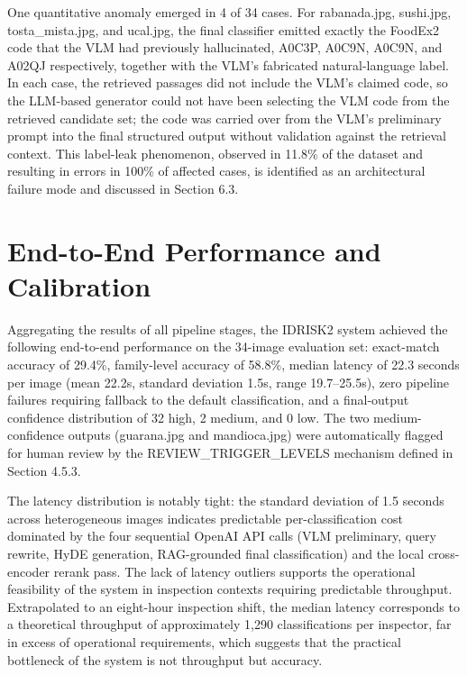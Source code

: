 One quantitative anomaly emerged in 4 of 34 cases. For rabanada.jpg, sushi.jpg, tosta\_mista.jpg, and ucal.jpg, the final classifier emitted exactly the FoodEx2 code that the VLM had previously hallucinated, A0C3P, A0C9N, A0C9N, and A02QJ respectively, together with the VLM's fabricated natural-language label. In each case, the retrieved passages did not include the VLM's claimed code, so the LLM-based generator could not have been selecting the VLM code from the retrieved candidate set; the code was carried over from the VLM's preliminary prompt into the final structured output without validation against the retrieval context. This label-leak phenomenon, observed in 11.8\% of the dataset and resulting in errors in 100\% of affected cases, is identified as an architectural failure mode and discussed in Section 6.3.

\hypertarget{end-to-end-performance-and-calibration}{%
\section{End-to-End Performance and Calibration}\label{end-to-end-performance-and-calibration}}

Aggregating the results of all pipeline stages, the IDRISK2 system achieved the following end-to-end performance on the 34-image evaluation set: exact-match accuracy of 29.4\%, family-level accuracy of 58.8\%, median latency of 22.3 seconds per image (mean 22.2s, standard deviation 1.5s, range 19.7--25.5s), zero pipeline failures requiring fallback to the default classification, and a final-output confidence distribution of 32 high, 2 medium, and 0 low. The two medium-confidence outputs (guarana.jpg and mandioca.jpg) were automatically flagged for human review by the REVIEW\_TRIGGER\_LEVELS mechanism defined in Section 4.5.3.

The latency distribution is notably tight: the standard deviation of 1.5 seconds across heterogeneous images indicates predictable per-classification cost dominated by the four sequential OpenAI API calls (VLM preliminary, query rewrite, HyDE generation, RAG-grounded final classification) and the local cross-encoder rerank pass. The lack of latency outliers supports the operational feasibility of the system in inspection contexts requiring predictable throughput. Extrapolated to an eight-hour inspection shift, the median latency corresponds to a theoretical throughput of approximately 1,290 classifications per inspector, far in excess of operational requirements, which suggests that the practical bottleneck of the system is not throughput but accuracy.

